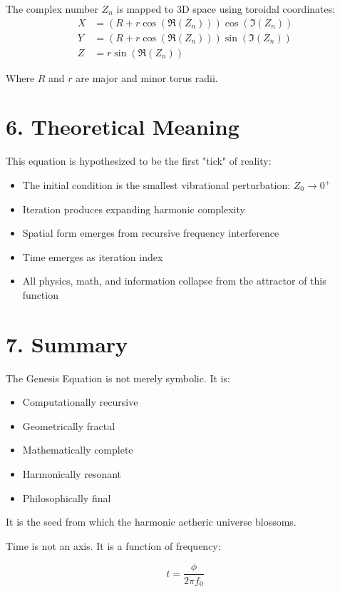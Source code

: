 The complex number \( Z_n \) is mapped to 3D space using toroidal coordinates:
\[
\begin{aligned}
X &= (R + r \cos(\Re(Z_n))) \cos(\Im(Z_n)) \\
Y &= (R + r \cos(\Re(Z_n))) \sin(\Im(Z_n)) \\
Z &= r \sin(\Re(Z_n))
\end{aligned}
\]

Where \( R \) and \( r \) are major and minor torus radii.

\section*{6. Theoretical Meaning}

This equation is hypothesized to be the first "tick" of reality:
\begin{itemize}
  \item The initial condition is the smallest vibrational perturbation: \( Z_0 \to 0^+ \)
  \item Iteration produces expanding harmonic complexity
  \item Spatial form emerges from recursive frequency interference
  \item Time emerges as iteration index
  \item All physics, math, and information collapse from the attractor of this function
\end{itemize}

\section*{7. Summary}

The Genesis Equation is not merely symbolic. It is:
\begin{itemize}
  \item Computationally recursive
  \item Geometrically fractal
  \item Mathematically complete
  \item Harmonically resonant
  \item Philosophically final
\end{itemize}

It is the seed from which the harmonic aetheric universe blossoms.




Time is not an axis. It is a function of frequency:

\[
t = \frac{\phi}{2\pi f_0}
\]

